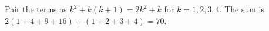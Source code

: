 Pair the terms as $k^2+k(k+1)=2k^2+k$ for $k=1,2,3,4$. The sum is $2(1+4+9+16)+(1+2+3+4)=\boxed{70}$.
